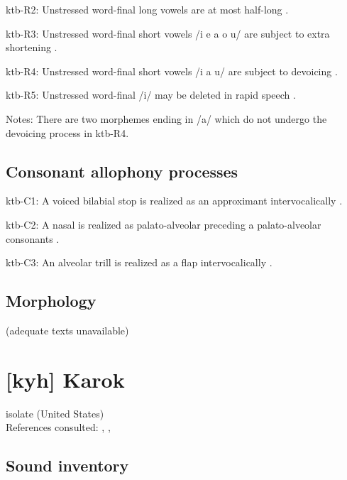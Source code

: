 {\begin{appendixdesc}
\item[ktb-R2:] Unstressed word-final long vowels are at most half-long \citep[19]{Treis2008}.

\item[ktb-R3:] Unstressed word-final short vowels /i e a o u/ are subject to extra shortening \citep[20]{Treis2008}.

\item[ktb-R4:] Unstressed word-final short vowels /i a u/ are subject to devoicing \citep[20]{Treis2008}.

\item[ktb-R5:] Unstressed word-final /i/ may be deleted in rapid speech \citep[20]{Treis2008}.

\item[Notes:] There are two morphemes ending in /a/ which do not undergo the devoicing process in ktb-R4.
\end{appendixdesc}
\subsection*{Consonant allophony processes}
\begin{appendixdesc}

\item[ktb-C1:] A voiced bilabial stop is realized as an approximant intervocalically \citep[24]{Treis2008}.

\item[ktb-C2:] A nasal is realized as palato-alveolar preceding a palato-alveolar consonants \citep[34]{Treis2008}.

\item[ktb-C3:] An alveolar trill is realized as a flap intervocalically \citep[35]{Treis2008}.
\end{appendixdesc}
\subsection*{Morphology}

(adequate texts unavailable)

\section*{[kyh] Karok}  %
isolate (United States)\medskip\\
References consulted: \citet{DeAnguloFreeland1931}, \citet{Bright1957}, \citet{Sandy2014}

\subsection*{Sound inventory}
\begin{appendixdesc}


\end{appendixdesc}}
